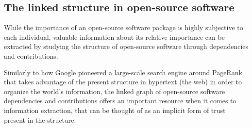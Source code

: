 
\subsection{The linked structure in open-source software}


While the importance of an open-source software package is highly subjective to
each individual, valuable information about its relative importance can be
extracted by studying the structure of open-source software through
dependencies and contributions.

Similarly to how Google pioneered a large-scale search engine around PageRank
that takes advantage of the present structure in hypertext (the web) in order
to organize the world’s information, the linked graph of open-source software
dependencies and contributions offers an important resource when it comes to information
extraction, that can be thought of as an implicit form of trust
present in the structure.

